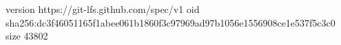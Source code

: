 version https://git-lfs.github.com/spec/v1
oid sha256:dc3f46051165f1abee061b1860f3c97969ad97b1056e1556908ce1e537f5c3c0
size 43802
